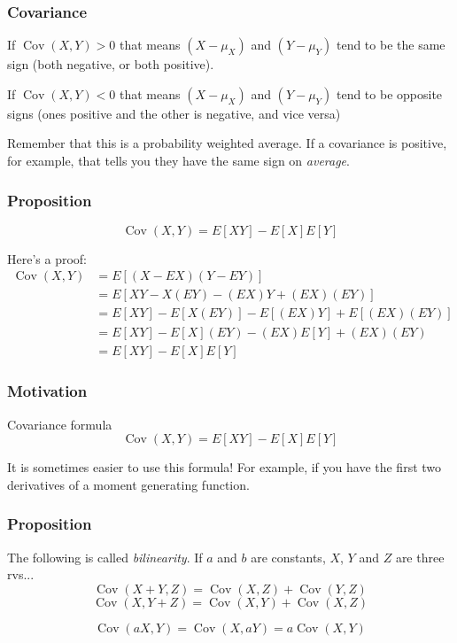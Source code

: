 \documentclass{beamer}
\begin{document}
\begin{frame}
\frametitle{Covariance}

If $\operatorname{Cov}(X,Y) > 0$ that means $(X-\mu_X)$ and $(Y-\mu_Y)$ tend to be the same sign (both negative, or both positive).
\newline

If $\operatorname{Cov}(X,Y) < 0$ that means $(X-\mu_X)$ and $(Y-\mu_Y)$ tend to be opposite signs (ones positive and the other is negative, and vice versa)
\newline

Remember that this is a probability weighted average. If a covariance is positive, for example, that tells you they have the same sign on \emph{average}.

\end{frame}

\begin{frame}
\frametitle{Proposition}

\[
\operatorname{Cov}(X,Y) = E[XY] - E[X]E[Y]
\]

Here's a proof:
\begin{align*}
\operatorname{Cov}(X,Y) &= E[(X - EX)(Y - EY)]\\
&= E[XY - X(EY) - (EX)Y + (EX)(EY)] \\
&= E[XY] - E[X(EY)] - E[(EX)Y] + E[(EX)(EY)] \\
&= E[XY] - E[X](EY) - (EX)E[Y] + (EX)(EY) \\
&= E[XY] - E[X]E[Y]
\end{align*}
\end{frame}

\begin{frame}
\frametitle{Motivation}


\begin{block}{Covariance formula}
\[
\operatorname{Cov}(X,Y) = E[XY] - E[X]E[Y]
\]
\end{block}

It is sometimes easier to use this formula! For example, if you have the first two derivatives of a moment generating function.


\end{frame}

\begin{frame}
\frametitle{Proposition}

The following is called \emph{bilinearity}. If $a$ and $b$ are constants, $X$, $Y$ and $Z$ are three rvs...
\[
\operatorname{Cov}(X + Y,Z) = \operatorname{Cov}(X,Z) + \operatorname{Cov}(Y,Z)
\]
\[
\operatorname{Cov}(X, Y + Z) = \operatorname{Cov}(X,Y) + \operatorname{Cov}(X,Z)
\]

\[
\operatorname{Cov}(aX, Y) = \operatorname{Cov}(X,aY) = a \operatorname{Cov}(X,Y) 
\]

\end{frame}
\end{document}
